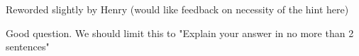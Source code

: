 \begin{parts}
\begin{qauthor}
    Reworded slightly by Henry (would like feedback on necessity of the hint here)
\end{qauthor}
\begin{qtester}
    Good question. We should limit this to "Explain your answer in no more than 2 sentences"
\end{qtester}

    
\begin{comment}
\part[4] Consider a non-standard deck of cards where each of the 4 suits (hearts, diamonds, spades, clubs) contains an indeterminate number of cards. You would like to estimate the probability of drawing a diamond on your first try.
\begin{subparts}
\subpart[2] Your friend claims to be a seasoned veteran to weird card-drawing games and claims that the likelihood of drawing a diamond can be modeled by a Beta distribution! Given that you do not have very much time to do the math behind a MAP estimation on the fly (the dealer is waiting for you to draw), is this prior distribution a computationally feasible one to try out? Why or why not?
    \begin{tcolorbox}[fit,height=6cm, width=15cm, blank, borderline={1pt}{-2pt}]
    \end{tcolorbox}
    \begin{soln}
    Yes - the beta distribution is a conjugate prior for the bernoulli distribution, which are known to have lots of ‘cancellable’ properties in their density functions when combined in MAP estimation
    \end{soln}

       \begin{qtester}
        Good question. However, I don't think conjugate priors were covered in class. Need to check on this. 
    \end{qtester}

\subpart[2] You decide to reject your friend’s offer of help and simply want to learn through trial and error (drawing lots of cards, recording the times you pull a diamond or do not pull a diamond). You now wish to derive an MLE estimate of this probability. However there seems to be a problem - your likelihood function is a product over individual likelihoods, which seems hopeless to optimize over a parameter! What step/mathematical transformation are you missing, and what does this transformation accomplish?
    \begin{tcolorbox}[fit,height=6cm, width=15cm, blank, borderline={1pt}{-2pt}]
    \end{tcolorbox}
    \begin{soln}
    Take the log of likelihood function - turns the product into a sum of likelihoods, whose derivative can also be expressed as a sum of derivatives of likelihoods
    \end{soln}


\end{comment}
\end{parts}

